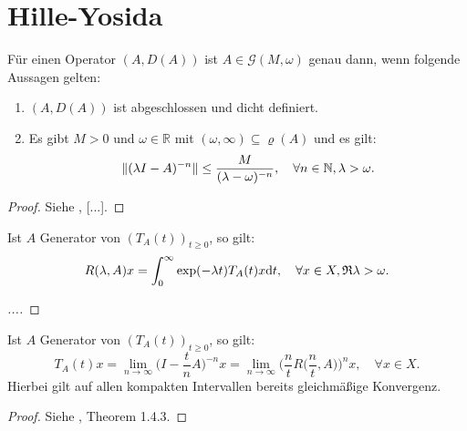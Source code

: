 \section{Hille-Yosida}

\begin{fsatz}\label{Hille-Yosida}
Für einen Operator $(A, D(A))$ ist $A\in \mathcal G(M,\omega)$ genau dann, wenn folgende Aussagen gelten:
\begin{enumerate}
\item $(A, D(A))$ ist abgeschlossen und dicht definiert.
\item Es gibt $M> 0$ und $\omega \in\mathbb R$ mit $(\omega, \infty)\subseteq \varrho(A)$ und es gilt:
\begin{equation*}
\|(\lambda I- A)^{-n}\|\leq\frac{M}{ (\lambda - \omega)^{-n}},\quad\forall n\in\mathbb{N},\lambda > \omega. 
\end{equation*}
\end{enumerate}
\end{fsatz}

\begin{proof}
Siehe \cite{engel_nagel_2006}, [...].
\end{proof}

\begin{bem}\label{Toll, Hille}
Ist $A$ Generator von $(T_A(t))_{t\geq0}$, so gilt:
\begin{equation*}
R(\lambda, A)x = \int_0^\infty \exp(-\lambda t)T_A(t)x\text dt,\quad  \forall x\in X, \mathfrak R \lambda >\omega.
\end{equation*}
\end{bem}

\begin{proof}
[...]
\end{proof}

\begin{satz}\label{Darstellung von T}
Ist $A$ Generator von  $(T_A(t))_{t\geq0}$, so gilt:
\begin{equation*}\label{Darstellung der Gruppe mithilfe der Resolvente}
T_A(t)x = \lim_{n\to\infty}\Big(I- \frac t n A\Big)^{-n}x = \lim_{n\to\infty} \Big(\frac n t R\Big(\frac n t, A\Big)\Big)^n x,\quad\forall x\in X.
\end{equation*}
Hierbei gilt  auf allen kompakten Intervallen bereits gleichmäßige Konvergenz.
\end{satz}

\begin{proof}
Siehe \cite{pazy_1983}, Theorem 1.4.3.
\end{proof}

